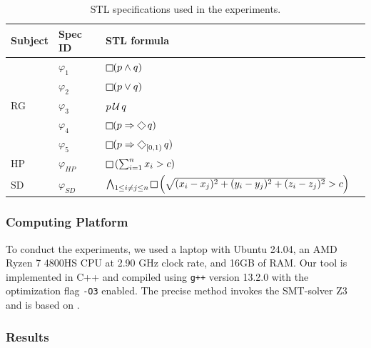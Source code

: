 \begin{table}
\centering
\begin{tabular}{|l|l|l|l|}
\hline
Subject & Spec ID & STL formula \\
\hline
\multirow{ 5}{*}{RG}
& $\varphi_1$ & $\LTLg (p \wedge q)$  \\
& $\varphi_2$ & $\LTLg (p \vee q)$ & \\
& $\varphi_3$ & $ p \operatorname{\mathcal{U}} q$ & \\
& $\varphi_4$ & $\LTLg (p \Rightarrow \LTLf q)$ \\
& $\varphi_5$ & $\LTLg (p \Rightarrow \LTLf_{[0,1)} q)$  \\
\hline
HP & $\varphi_{HP}$ & $\LTLg \left(\sum_{i=1}^{n} x_i  > c\right)$  \\
SD & $\varphi_{SD}$ & $\bigwedge_{1 \leq i \neq j \leq n} \LTLg \left( \sqrt{(x_i-x_j)^2 + (y_i-y_j)^2 + (z_i-z_j)^2} > c \right)$   \\
\hline
\end{tabular}
\caption{STL specifications used in the experiments.}
\label{tab:spec} 
\end{table}

\subsubsection{Computing Platform}

To conduct the experiments, we used a laptop with Ubuntu 24.04, an AMD Ryzen 7 4800HS CPU at 2.90 GHz clock rate, and 16GB of RAM.
Our tool is implemented in C++ and compiled using \texttt{g++} version 13.2.0 with the optimization flag \texttt{-O3} enabled.
The precise method invokes the SMT-solver Z3 \cite{MouraB08} and is based on \cite{MomtazAB23}.

\subsubsection{Results}

